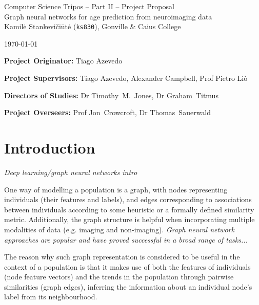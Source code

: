 \documentclass[12pt,a4paper,twoside]{article}
\begin{document}
\begin{center}
\Large
Computer Science Tripos -- Part II -- Project Proposal\\[4mm]
\LARGE
Graph neural networks for age prediction from neuroimaging data \\[4mm]

\large
Kamilė Stankevičiūtė (\texttt{ks830}), Gonville \& Caius College

\today %
\end{center}

\vspace{5mm}
\textbf{Project Originator:} Tiago Azevedo

\textbf{Project Supervisors:} Tiago Azevedo, Alexander Campbell, Prof Pietro Liò

\textbf{Directors of Studies:} Dr Timothy~M.~Jones, Dr Graham~Titmus

\textbf{Project Overseers:} Prof Jon~Crowcroft, Dr Thomas~Sauerwald


\section*{Introduction}

\textit{Deep learning/graph neural networks intro}


One way of modelling a population is a graph, with nodes representing individuals (their features and labels), and edges corresponding to associations between individuals according to some heuristic or a formally defined similarity metric. Additionally, the graph structure is helpful when incorporating multiple modalities of data (e.g. imaging and non-imaging). \textit{Graph neural network approaches are popular and have proved successful in a broad range of tasks...}

The reason why such graph representation is considered to be useful in the  context of a population is that it makes use of both the features of individuals (node feature vectors) and the trends in the population through pairwise similarities (graph edges), inferring the information about an individual node's label from its neighbourhood.
\end{document}
